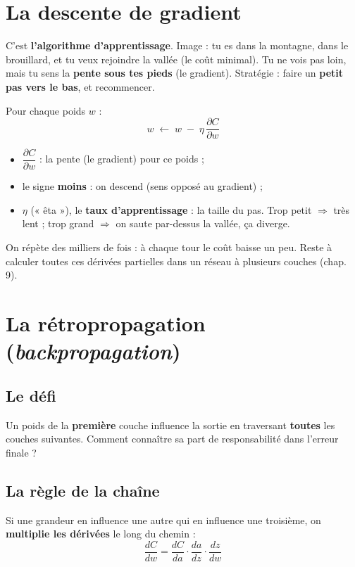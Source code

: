 \documentclass[11pt]{article}
\begin{document}
\section{La descente de gradient}

C'est \textbf{l'algorithme d'apprentissage}. Image : tu es dans la montagne, dans
le brouillard, et tu veux rejoindre la vallée (le coût minimal). Tu ne vois pas
loin, mais tu sens la \textbf{pente sous tes pieds} (le gradient). Stratégie :
faire un \textbf{petit pas vers le bas}, et recommencer.

Pour chaque poids $w$ :
\[
w \;\leftarrow\; w \;-\; \eta\,\frac{\partial C}{\partial w}
\]
\begin{itemize}[leftmargin=2em]
  \item $\dfrac{\partial C}{\partial w}$ : la pente (le gradient) pour ce poids ;
  \item le signe \textbf{moins} : on descend (sens opposé au gradient) ;
  \item $\eta$ (« êta »), le \textbf{taux d'apprentissage} : la taille du pas.
  Trop petit $\Rightarrow$ très lent ; trop grand $\Rightarrow$ on saute par-dessus
  la vallée, ça diverge.
\end{itemize}
On répète des milliers de fois : à chaque tour le coût baisse un peu. Reste à
calculer toutes ces dérivées partielles dans un réseau à plusieurs couches
(chap. 9).

\section{La rétropropagation (\emph{backpropagation})}

\subsection{Le défi}
Un poids de la \textbf{première} couche influence la sortie en traversant
\textbf{toutes} les couches suivantes. Comment connaître sa part de responsabilité
dans l'erreur finale ?

\subsection{La règle de la chaîne}
Si une grandeur en influence une autre qui en influence une troisième, on
\textbf{multiplie les dérivées} le long du chemin :
\[
\frac{dC}{dw} = \frac{dC}{da}\cdot\frac{da}{dz}\cdot\frac{dz}{dw}
\]
\end{document}
